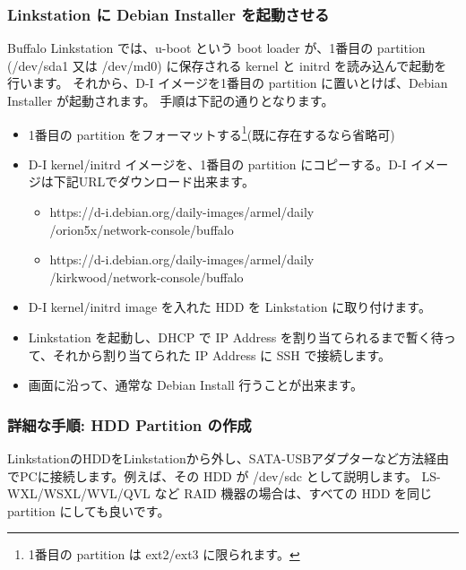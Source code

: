 \documentclass[mingoth,a4paper]{jsarticle}
\begin{document}
\subsubsection{Linkstation に Debian Installer を起動させる}
Buffalo Linkstation では、u-boot という boot loader が、1番目の partition (/dev/sda1 又は /dev/md0) に保存される kernel と initrd を読み込んで起動を行います。
それから、D-I イメージを1番目の partition に置いとけば、Debian Installer が起動されます。
手順は下記の通りとなります。
\begin{itemize}
\item 1番目の partition をフォーマットする\footnote{1番目の partition は ext2/ext3 に限られます。}(既に存在するなら省略可)
\item D-I kernel/initrd イメージを、1番目の partition にコピーする。D-I イメージは下記URLでダウンロード出来ます。
	\begin{itemize}
	\item https://d-i.debian.org/daily-images/armel/daily\\/orion5x/network-console/buffalo
	\item https://d-i.debian.org/daily-images/armel/daily\\/kirkwood/network-console/buffalo
	\end{itemize}
\item D-I kernel/initrd image を入れた HDD を Linkstation に取り付けます。
\item Linkstation を起動し、DHCP で IP Address を割り当てられるまで暫く待って、それから割り当てられた IP Address に SSH で接続します。
\item 画面に沿って、通常な Debian Install 行うことが出来ます。
\end{itemize}

\subsubsection{詳細な手順: HDD Partition の作成}
LinkstationのHDDをLinkstationから外し、SATA-USBアダプターなど方法経由でPCに接続します。例えば、その HDD が /dev/sdc として説明します。
LS-WXL/WSXL/WVL/QVL など RAID 機器の場合は、すべての HDD を同じ partition にしても良いです。
\end{document}
